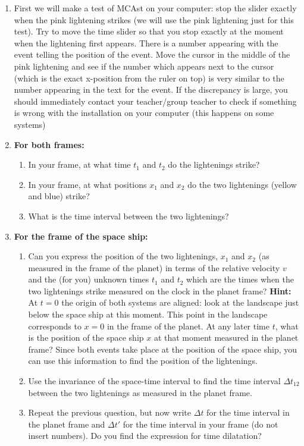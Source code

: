 {\begin{multicols}{2}
\begin{enumerate}
\item First we will make a test of MCAst on your computer: stop the slider exactly when the pink lightening strikes (we will use the pink lightening just for this test). Try to move the time slider so that you stop exactly at the moment when the lightening first appears. There is a number appearing with the event telling the position of the event. Move the cursor in the middle of the pink lightening and see if the number which appears next to the cursor (which is the exact x-position from the ruler on top) is very similar to the number appearing in the text for the event. If the discrepancy is large, you should immediately contact your teacher/group teacher to check if something is wrong with the installation on your computer (this happens on some systems)
\item {\bf For both frames:} 
\begin{enumerate}
\item In your frame, at what time $t_1$ and $t_2$ do the lightenings strike? 
\item In your frame, at what positions $x_1$ and $x_2$ do the two lightenings (yellow and blue) strike? 
\item What is the time interval between the two lightenings?
\end{enumerate}
\item {\bf For the frame of the space ship:}
\begin{enumerate}
\item Can you express the position of the two lightenings, $x_1$ and $x_2$ (as measured in the frame of the planet) in terms of the relative velocity $v$ and the (for you) unknown times $t_1$ and $t_2$ which are the times when the two lightenings strike measured on the clock in the planet frame? {\bf Hint:} At $t=0$ the origin of both systems are aligned: look at the landscape just below the space ship at this moment. This point in the landscape corresponds to $x=0$ in the frame of the planet. At any later time $t$, what is the position of the space ship $x$ at that moment measured in the planet frame? Since both events take place at the position of the space ship, you can use this information to find the position of the lightenings.
\item Use the invariance of the space-time interval to find the time interval $\Delta t_\mathrm{12}$ between the two lightenings as measured in the planet frame.
\item Repeat the previous question, but now write $\Delta t$ for the time interval in the planet frame and $\Delta t'$ for the time interval in your frame (do not insert numbers). Do you find the expression for time dilatation?

\end{enumerate}
\end{enumerate}
\end{multicols}}
